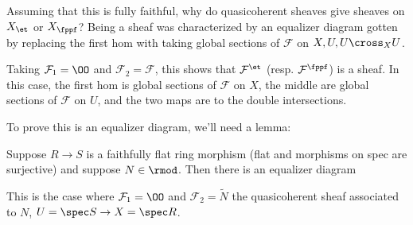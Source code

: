 Assuming that this is fully faithful, why do quasicoherent sheaves give
sheaves on \(X_{\et}\) or \(X_{\fppf}\)? Being a sheaf was characterized
by an equalizer diagram gotten by replacing the first hom with taking
global sections of \(\mathcal{F}\) on \(X, U, U\cross_X U\).

\begin{remark}

Taking \(\mathcal{F}_1 = \OO\) and \(\mathcal{F}_2 = \mathcal{F}\), this
shows that \(\mathcal{F}^{\et}\) (resp. \(\mathcal{F}^{\fppf}\)) is a
sheaf. In this case, the first hom is global sections of \(\mathcal{F}\)
on \(X\), the middle are global sections of \(\mathcal{F}\) on \(U\),
and the two maps are to the double intersections.

\end{remark}

To prove this is an equalizer diagram, we'll need a lemma:

\begin{lemma}[?]

Suppose \(R\to S\) is a faithfully flat ring morphism (flat and
morphisms on spec are surjective) and suppose \(N\in \rmod\). Then there
is an equalizer diagram

\begin{center}
\end{center}

\end{lemma}

This is the case where \(\mathcal{F}_1 = \OO\) and
\(\mathcal{F}_2 = \tilde N\) the quasicoherent sheaf associated to
\(N\), \(U = \spec S \to X = \spec R\).

